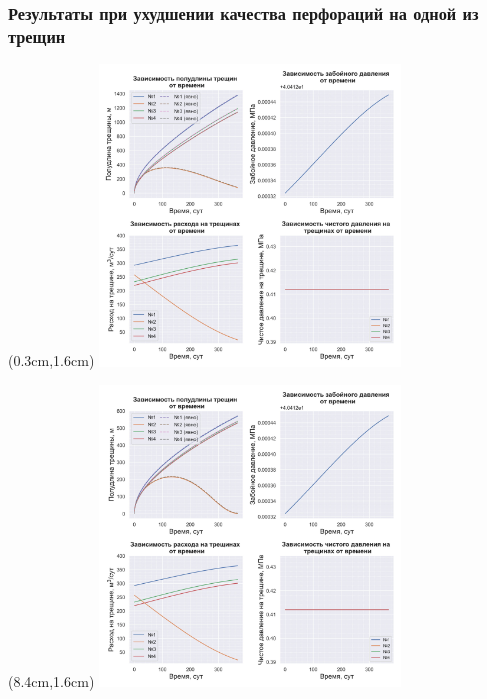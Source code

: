 \documentclass{beamer}
\begin{document}
\begin{frame}
\frametitle{Результаты при ухудшении качества перфораций на одной из трещин}

\begin{textblock*}{8cm}(0.3cm,1.6cm)
\includegraphics[width=8cm]{myimage7.jpg}
\end{textblock*}

\begin{textblock*}{8cm}(8.4cm,1.6cm)
%
  {\includegraphics[width=8cm]{myimage8.jpg}}
\end{textblock*}

\end{frame}
\end{document}

